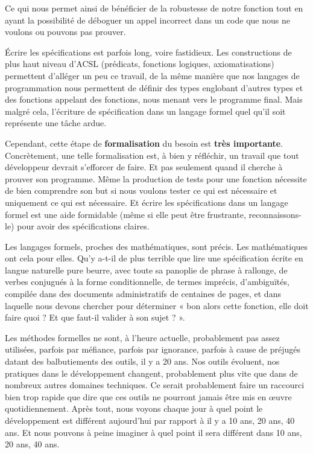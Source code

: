 Ce qui nous permet ainsi de bénéficier de la robustesse de notre fonction tout en
ayant la possibilité de déboguer un appel incorrect dans un code que nous ne
voulons ou pouvons pas prouver.



Écrire les spécifications est parfois long, voire fastidieux. Les constructions
de plus haut niveau d'ACSL (prédicats, fonctions logiques, axiomatisations)
permettent d'alléger un peu ce travail, de la même manière que nos langages de
programmation nous permettent de définir des types englobant d'autres types et
des fonctions appelant des fonctions, nous menant vers le programme final. Mais
malgré cela, l'écriture de spécification dans un langage formel quel qu'il soit
représente une tâche ardue.



Cependant, cette étape de \textbf{formalisation} du besoin est \textbf{très importante}.
Concrètement, une telle formalisation est, à bien y réfléchir, un travail que
tout développeur devrait s'efforcer de faire. Et pas seulement quand il cherche
à prouver son programme. Même la production de tests pour une fonction
nécessite de bien comprendre son but si nous voulons tester ce qui est nécessaire
et uniquement ce qui est nécessaire. Et écrire les spécifications dans un
langage formel est une aide formidable (même si elle peut être frustrante,
reconnaissons-le) pour avoir des spécifications claires.



Les langages formels, proches des mathématiques, sont précis. Les mathématiques
ont cela pour elles. Qu'y a-t-il de plus terrible que lire une spécification
écrite en langue naturelle pure beurre, avec toute sa panoplie de phrase à
rallonge, de verbes conjugués à la forme conditionnelle, de termes imprécis,
d'ambiguïtés, compilée dans des documents administratifs de centaines de pages,
et dans laquelle nous devons chercher pour déterminer « bon alors cette fonction,
elle doit faire quoi ? Et que faut-il valider à son sujet ? ».



Les méthodes formelles ne sont, à l'heure actuelle, probablement pas assez
utilisées, parfois par méfiance, parfois par ignorance, parfois à cause de
préjugés datant des balbutiements des outils, il y a 20 ans. Nos outils
évoluent, nos pratiques dans le développement changent, probablement plus
vite que dans de nombreux autres domaines techniques. Ce serait probablement
faire un raccourci bien trop rapide que dire que ces outils ne pourront
jamais être mis en œuvre quotidiennement. Après tout, nous voyons chaque jour
à quel point le développement est différent aujourd'hui par rapport à il y a
10 ans, 20 ans, 40 ans. Et nous pouvons à peine imaginer à quel point il sera
différent dans 10 ans, 20 ans, 40 ans.



